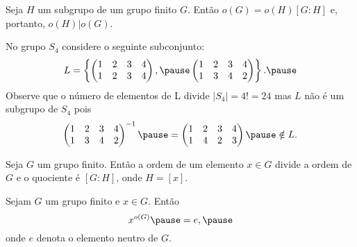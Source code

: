 \documentclass{beamer}
\begin{document}
    \begin{frame}
        \begin{teorema}
            Seja $H$ um subgrupo \pause de um grupo finito $G$. \pause Então $o(G) = o(H)[G:H]$ \pause e, portanto, $o(H) | o(G)$.
        \end{teorema}
    \end{frame}

    \begin{frame}
        \begin{observacao}
            No grupo $S_4$ \pause considere o seguinte subconjunto: \pause
            \[
                L = \left\{\begin{pmatrix}
                    1 & 2 & 3 & 4\\
                    1 & 2 & 3 & 4
                \end{pmatrix}, \pause \begin{pmatrix}
                    1 & 2 & 3 & 4\\
                    1 & 3 & 4 & 2
                \end{pmatrix}\right\}. \pause
            \]
            Observe que o n\'umero de elementos de L \pause divide $|S_4| = 4! = 24$ \pause mas $L$ não é um subgrupo de $S_4$ \pause pois
            \[
                \begin{pmatrix}
                    1 & 2 & 3 & 4\\
                    1 & 3 & 4 & 2
                \end{pmatrix}^{-1} \pause = \begin{pmatrix}
                    1 & 2 & 3 & 4\\
                    1 & 4 & 2 & 3
                \end{pmatrix} \pause \notin L.
            \]
        \end{observacao}
    \end{frame}

    \begin{frame}
        \begin{corolario}
            Seja $G$ um grupo finito. \pause Então a ordem de um elemento $x \in G$ \pause divide a ordem de $G$ \pause e o quociente é $[G : H]$, \pause onde $H = [x]$.
        \end{corolario}
    \end{frame}

    \begin{frame}
        \begin{corolario}
            Sejam $G$ um grupo finito \pause e $x \in G$. \pause Então
            \[
                x^{o(G)} \pause = e, \pause
            \]
            onde $e$ denota o elemento neutro de $G$.
        \end{corolario}
    \end{frame}
\end{document}
